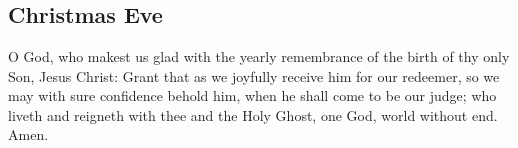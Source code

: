 







\chapter[Lesser Feasts and Fasts]{}

\section{Christmas Eve}
 O God, who makest us glad with the yearly remembrance of the birth of thy only Son, Jesus Christ: Grant that as we joyfully receive him for our redeemer, so we may with sure confidence behold him, when he shall come to be our judge; who liveth and reigneth with thee and the Holy Ghost, one God, world without end. \R Amen.

